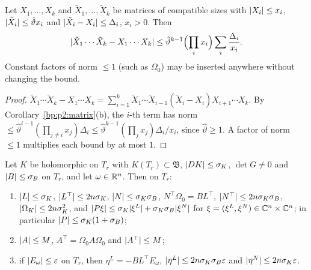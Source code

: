 \begin{lemma}\label{bp:p2s:telescope}
Let $X_1,\dots,X_k$ and $\tilde X_1,\dots,\tilde X_k$ be matrices of compatible sizes with $\lvert X_i\rvert\le x_i$,
$\lvert \tilde X_i\rvert\le\hat\vartheta x_i$ and $\lvert \tilde X_i-X_i\rvert\le\Delta_i$, $x_i>0$. Then
\[
\lvert \tilde X_1\cdots\tilde X_k-X_1\cdots X_k\rvert\le\hat\vartheta^{k-1}\Bigl(\prod_ix_i\Bigr)\sum_i\frac{\Delta_i}{x_i}.
\]
Constant factors of norm $\le1$ (such as $\Omega_0$) may be inserted anywhere without changing the bound.
\end{lemma}

\begin{proof}
\label{step:p2s:tel-sum}
$\tilde X_1\cdots\tilde X_k-X_1\cdots X_k=\sum_{i=1}^k\tilde X_1\cdots\tilde X_{i-1}(\tilde X_i-X_i)X_{i+1}\cdots X_k$.
By Corollary~\ref{bp:p2:matrix}(b), the $i$-th term has norm $\le\hat\vartheta^{i-1}(\prod_{j\ne i}x_j)\Delta_i
\le\hat\vartheta^{k-1}(\prod_jx_j)\Delta_i/x_i$, since $\hat\vartheta\ge1$. A factor of norm $\le1$ multiplies each
bound by at most $1$.
\end{proof}

\begin{lemma}\label{bp:p2s:frame-bounds}
Let $K$ be holomorphic on $T_r$ with $K(T_r)\subset\mathfrak B$, $\lvert DK\rvert\le\sigma_K$, $\det G\ne0$ and $\lvert B\rvert\le\sigma_B$ on
$T_r$, and let $\omega\in\mathbb{R}^n$. Then on $T_r$:
\begin{enumerate}[label=(\alph*)]
\item $\lvert L\rvert\le\sigma_K$, $\lvert L^\top\rvert\le2n\sigma_K$, $\lvert N\rvert\le\sigma_K\sigma_B$, $N^\top\Omega_0=BL^\top$, $\lvert N^\top\rvert\le
  2n\sigma_K\sigma_B$, $\lvert \Omega_K\rvert\le2n\sigma_K^2$, and $\lvert P\xi\rvert\le\sigma_K\lvert \xi^L\rvert+\sigma_K\sigma_B\lvert \xi^N\rvert$ for
  $\xi=(\xi^L,\xi^N)\in\mathbb{C}^n\times\mathbb{C}^n$; in particular $\lvert P\rvert\le\sigma_K(1+\sigma_B)$;
\item $\lvert A\rvert\le M$, $A^\top=\Omega_0A\Omega_0$ and $\lvert A^\top\rvert\le M$;
\item if $\lvert E_\omega\rvert\le\varepsilon$ on $T_r$, then $\eta^L=-BL^\top E_\omega$, $\lvert \eta^L\rvert\le2n\sigma_K\sigma_B\varepsilon$ and
  $\lvert \eta^N\rvert\le2n\sigma_K\varepsilon$.
\end{enumerate}
\end{lemma}

